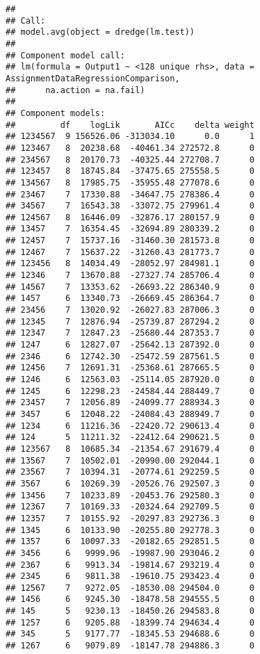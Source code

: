 \documentclass[]{article}
\begin{document}
\begin{verbatim}
## 
## Call:
## model.avg(object = dredge(lm.test))
## 
## Component model call: 
## lm(formula = Output1 ~ <128 unique rhs>, data = AssignmentDataRegressionComparison, 
##      na.action = na.fail)
## 
## Component models: 
##         df    logLik       AICc    delta weight
## 1234567  9 156526.06 -313034.10      0.0      1
## 123467   8  20238.68  -40461.34 272572.8      0
## 234567   8  20170.73  -40325.44 272708.7      0
## 123457   8  18745.84  -37475.65 275558.5      0
## 134567   8  17985.75  -35955.48 277078.6      0
## 23467    7  17330.88  -34647.75 278386.4      0
## 34567    7  16543.38  -33072.75 279961.4      0
## 124567   8  16446.09  -32876.17 280157.9      0
## 13457    7  16354.45  -32694.89 280339.2      0
## 12457    7  15737.16  -31460.30 281573.8      0
## 12467    7  15637.22  -31260.43 281773.7      0
## 123456   8  14034.49  -28052.97 284981.1      0
## 12346    7  13670.88  -27327.74 285706.4      0
## 14567    7  13353.62  -26693.22 286340.9      0
## 1457     6  13340.73  -26669.45 286364.7      0
## 23456    7  13020.92  -26027.83 287006.3      0
## 12345    7  12876.94  -25739.87 287294.2      0
## 12347    7  12847.23  -25680.44 287353.7      0
## 1247     6  12827.07  -25642.13 287392.0      0
## 2346     6  12742.30  -25472.59 287561.5      0
## 12456    7  12691.31  -25368.61 287665.5      0
## 1246     6  12563.03  -25114.05 287920.0      0
## 1245     6  12298.23  -24584.44 288449.7      0
## 23457    7  12056.89  -24099.77 288934.3      0
## 3457     6  12048.22  -24084.43 288949.7      0
## 1234     6  11216.36  -22420.72 290613.4      0
## 124      5  11211.32  -22412.64 290621.5      0
## 123567   8  10685.34  -21354.67 291679.4      0
## 13567    7  10502.01  -20990.00 292044.1      0
## 23567    7  10394.31  -20774.61 292259.5      0
## 3567     6  10269.39  -20526.76 292507.3      0
## 13456    7  10233.89  -20453.76 292580.3      0
## 12367    7  10169.33  -20324.64 292709.5      0
## 12357    7  10155.92  -20297.83 292736.3      0
## 1345     6  10133.90  -20255.80 292778.3      0
## 1357     6  10097.33  -20182.65 292851.5      0
## 3456     6   9999.96  -19987.90 293046.2      0
## 2367     6   9913.34  -19814.67 293219.4      0
## 2345     6   9811.38  -19610.75 293423.4      0
## 12567    7   9272.05  -18530.08 294504.0      0
## 1456     6   9245.30  -18478.58 294555.5      0
## 145      5   9230.13  -18450.26 294583.8      0
## 1257     6   9205.88  -18399.74 294634.4      0
## 345      5   9177.77  -18345.53 294688.6      0
## 1267     6   9079.89  -18147.78 294886.3      0

\end{verbatim}
\end{document}
